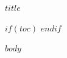 \documentclass[12pt,a4paper,UTF8]{ctexart}
\begin{document}
\begin{titlepage}
  \centering
  \vspace*{58mm}
  {\Huge\bfseries\color{ContestBlue} $title$\par}
  \vfill
  \vspace*{28mm}
\end{titlepage}

$if(toc)$
\tableofcontents
\clearpage
$endif$

$body$
\end{document}
